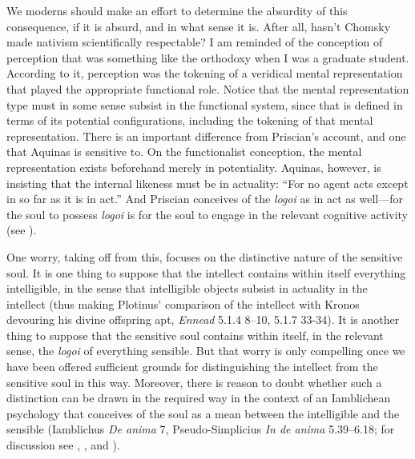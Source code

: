 \documentclass[12pt]{article}
\begin{document}
We moderns should make an effort to determine the absurdity of this consequence, if it is absurd, and in what sense it is. After all, hasn't Chomsky made nativism scientifically respectable? I am reminded of the conception of perception that was something like the orthodoxy when I was a graduate student. According to it, perception was the tokening of a veridical mental representation that played the appropriate functional role. Notice that the mental representation type must in some sense subsist in the functional system, since that is defined in terms of its potential configurations, including the tokening of that mental representation. There is an important difference from Priscian's account, and one that Aquinas is sensitive to. On the functionalist conception, the mental representation exists beforehand merely in potentiality. Aquinas, however, is insisting that the internal likeness must be in actuality: ``For no agent acts except in so far as it is in act.'' And Priscian conceives of the \emph{logoi} as in act as well---for the soul to possess \emph{logoi} is for the soul to engage in the relevant cognitive activity (see \citealt{Steel:1997ec}). 

One worry, taking off from this, focuses on the distinctive nature of the sensitive soul. It is one thing to suppose that the intellect contains within itself everything intelligible, in the sense that intelligible objects subsist in actuality in the intellect (thus making Plotinus' comparison of the intellect with Kronos devouring his divine offspring apt, \emph{Ennead} 5.1.4 8--10, 5.1.7 33-34). It is another thing to suppose that the sensitive soul contains within itself, in the relevant sense, the \emph{logoi} of everything sensible. But that worry is only compelling once we have been offered sufficient grounds for distinguishing the intellect from the sensitive soul in this way. Moreover, there is reason to doubt whether such a distinction can be drawn in the required way in the context of an Iamblichean psychology that conceives of the soul as a mean between the intelligible and the sensible (Iamblichus \emph{De anima} 7, Pseudo-Simplicius \emph{In de anima} 5.39--6.18; for discussion see \citealt{Steel:1978th}, \citealt[91--93]{Finamore:2002yf}, and \citealt{Finamore:2014fc}).
\end{document}
